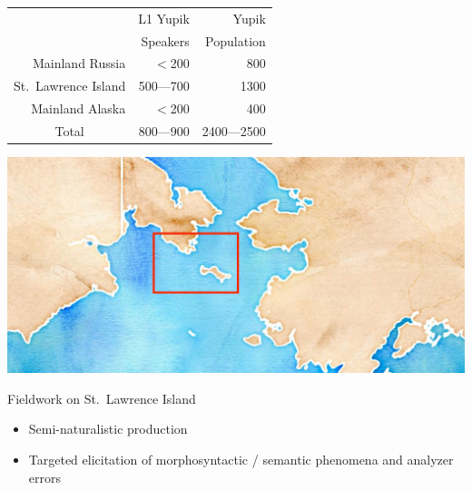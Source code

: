 \documentclass[usenames,dvipsnames]{beamer}
\begin{document}
\begin{frame}[fragile]
\begin{columns}[T]
\begin{column}{0.3\textwidth}
%
\begin{minipage}{0.49\textwidth}
\hspace*{-7mm}
\renewcommand{\arraystretch}{0.75}
\begin{tabular}{r|r|r|}
\cline{2-3}
 & \scriptsize L1 Yupik & \scriptsize Yupik \\ 
 & \scriptsize Speakers & \scriptsize Population \\ \hline
\multicolumn{}{|r|}{\scriptsize Mainland Russia}  &  \scriptsize $<$200 & \scriptsize 800      \\
\multicolumn{}{|r|}{\scriptsize St.~Lawrence Island} & \scriptsize 500---700 & \scriptsize 1300      \\
\multicolumn{}{|r|}{\scriptsize Mainland Alaska}    & \scriptsize  $<$200 & \scriptsize  400      \\
\hline
\hline
\multicolumn{}{|c|}{\scriptsize Total} & \scriptsize 800---900 & \scriptsize 2400---2500 \\ \hline
\end{tabular}
\end{minipage}
%
\begin{minipage}{0.49\textwidth}
\hspace*{8.5mm}\includegraphics[scale=0.34]{map-box.jpg}
\end{minipage}%
\vspace{18pt}

\begin{block}{Fieldwork on St.~Lawrence Island}

\begin{itemize}
 \setlength\itemsep{18pt}
        \item Semi-naturalistic production
        
        \item Targeted elicitation of morphosyntactic / semantic phenomena and analyzer errors
        

\end{itemize}
\end{block}
\end{column}
\end{columns}
\end{frame}
\end{document}
